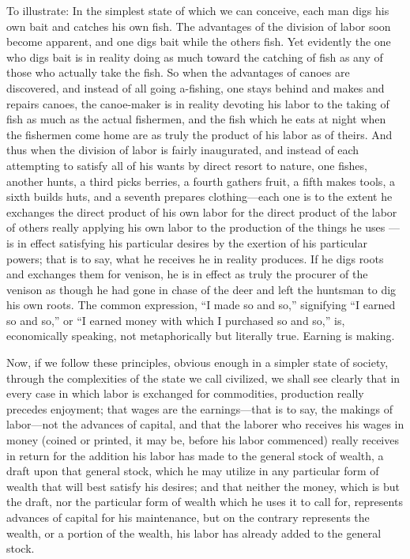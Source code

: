 To illustrate: In the simplest state of which we can conceive, each man
digs his own bait and catches his own fish. The advantages of the
division of labor soon become apparent, and one digs bait while the
others fish. Yet evidently the one who digs bait is in reality doing as
much toward the catching of fish as any of those who actually take the
fish. So when the advantages of canoes are discovered, and instead of
all going a-fishing, one stays behind and makes and repairs canoes, the
canoe-maker is in reality devoting his labor to the taking of fish as
much as the actual fishermen, and the fish which he eats at night when
the fishermen come home are as truly the product of his labor as of
theirs. And thus when the division of labor is fairly inaugurated, and
instead of each attempting to satisfy all of his wants by direct resort
to nature, one fishes, another hunts, a third picks berries, a fourth
gathers fruit, a fifth makes tools, a sixth builds huts, and a seventh
prepares clothing---each one is to the extent he exchanges the direct
product of his own labor for the direct product of the labor of others
really applying his own labor to the production of the things he uses
---is in effect satisfying his particular desires by the exertion of his
particular powers; that is to say, what he receives he in reality
produces. If he digs roots and exchanges them for venison, he is in
effect as truly the procurer of the venison as though he had gone in
chase of the deer and left the huntsman to dig his own roots. The common
expression, ``I made so and so,'' signifying ``I earned so and so,'' or
``I earned money with which I purchased so and so,'' is, economically
speaking, not metaphorically but literally true. Earning is making.

Now, if we follow these principles, obvious enough in a simpler state of
society, through the complexities of the state we call civilized, we
shall see clearly that in every case in which labor is exchanged for
commodities, production really precedes enjoyment; that wages are the
earnings---that is to say, the makings of labor---not the advances of
capital, and that the laborer who receives his wages in money (coined or
printed, it may be, before his labor commenced) really receives in
return for the addition his labor has made to the general stock of
wealth, a draft upon that general stock, which he may utilize in any
particular form of wealth that will best satisfy his desires; and that
neither the money, which is but the draft, nor the particular form of
wealth which he uses it to call for, represents advances of capital for
his maintenance, but on the contrary represents the wealth, or a portion
of the wealth, his labor has already added to the general stock.

